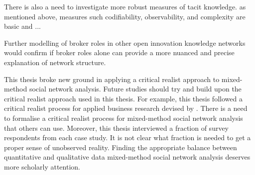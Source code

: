 There is also a need to investigate more robust measures of tacit knowledge. as mentioned above, measures such codifiability, observability, and complexity are basic and ...

Further modelling of broker roles in other open innovation knowledge networks would confirm if broker roles alone can provide a more nuanced and precise explanation of network structure. \medskip 

This thesis broke new ground in applying a critical realist approach to mixed-method social network analysis. Future studies should try and build upon the critical realist approach used in this thesis. For example, this thesis followed a critical realist process for applied business research devised by \cite{mcavoy2018critical}. There is a need to formalise a critical realist process for mixed-method social network analysis that others can use. Moreover, this thesis interviewed a fraction of survey respondents from each case study. It is not clear what fraction is needed to get a proper sense of unobserved reality. Finding the appropriate balance between quantitative and qualitative data mixed-method social network analysis deserves more scholarly attention. 


